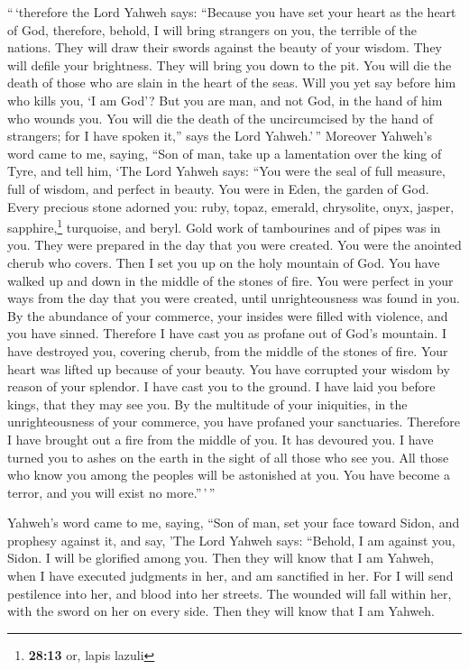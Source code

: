  ``\,`therefore the Lord Yahweh says: ``Because you have
set your heart as the heart of God,  therefore, behold, I
will bring strangers on you, the terrible of the nations. They will draw
their swords against the beauty of your wisdom. They will defile your
brightness.  They will bring you down to the pit. You will
die the death of those who are slain in the heart of the seas.
 Will you yet say before him who kills you, `I am God'?
But you are man, and not God, in the hand of him who wounds you.
 You will die the death of the uncircumcised by the hand
of strangers; for I have spoken it,'' says the Lord Yahweh.'\,''
 Moreover Yahweh's word came to me, saying,
 ``Son of man, take up a lamentation over the king of
Tyre, and tell him, `The Lord Yahweh says: ``You were the seal of full
measure, full of wisdom, and perfect in beauty.  You were
in Eden, the garden of God. Every precious stone adorned you: ruby,
topaz, emerald, chrysolite, onyx, jasper, sapphire,\footnote{\textbf{28:13}
  or, lapis lazuli} turquoise, and beryl. Gold work of tambourines and
of pipes was in you. They were prepared in the day that you were
created.  You were the anointed cherub who covers. Then I
set you up on the holy mountain of God. You have walked up and down in
the middle of the stones of fire.  You were perfect in
your ways from the day that you were created, until unrighteousness was
found in you.  By the abundance of your commerce, your
insides were filled with violence, and you have sinned. Therefore I have
cast you as profane out of God's mountain. I have destroyed you,
covering cherub, from the middle of the stones of fire. 
Your heart was lifted up because of your beauty. You have corrupted your
wisdom by reason of your splendor. I have cast you to the ground. I have
laid you before kings, that they may see you.  By the
multitude of your iniquities, in the unrighteousness of your commerce,
you have profaned your sanctuaries. Therefore I have brought out a fire
from the middle of you. It has devoured you. I have turned you to ashes
on the earth in the sight of all those who see you.  All
those who know you among the peoples will be astonished at you. You have
become a terror, and you will exist no more.''\,'\,''

 Yahweh's word came to me, saying,  ``Son
of man, set your face toward Sidon, and prophesy against it,
 and say, 'The Lord Yahweh says: ``Behold, I am against
you, Sidon. I will be glorified among you. Then they will know that I am
Yahweh, when I have executed judgments in her, and am sanctified in her.
 For I will send pestilence into her, and blood into her
streets. The wounded will fall within her, with the sword on her on
every side. Then they will know that I am Yahweh.

